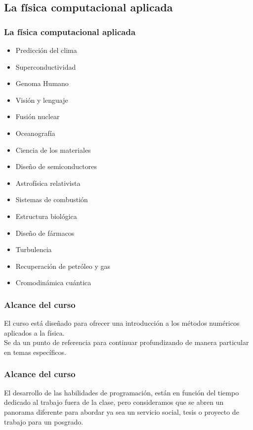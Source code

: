 \subsection{La física computacional aplicada}
\begin{frame}
\frametitle{La física computacional aplicada}
\fontsize{14}{14}\selectfont
\begin{multicols}{2}
\begin{itemize}[<+->]
	\item Predicción del clima
	\item Superconductividad
	\item Genoma Humano
	\item Visión y lenguaje
	\item Fusión nuclear
	\item Oceanografía
	\item Ciencia de los materiales
	\item Diseño de semiconductores
	\item Astrofísica relativista
	\item Sistemas de combustión
	\item Estructura biológica
	\item Diseño de fármacos
	\item Turbulencia
	\item Recuperación de petróleo y gas
	\item Cromodinámica cuántica
\end{itemize}
\end{multicols}
\end{frame}
\begin{frame}[fragile]
\begin{figure}
\centering

\end{figure}
\end{frame}
\begin{frame}
\frametitle{Alcance del curso}
El curso está diseñado para ofrecer una introducción a los métodos numéricos aplicados a la física.
\\
\medskip
Se da un punto de referencia para continuar profundizando de manera particular en temas específicos. 
\end{frame}
\begin{frame}
\frametitle{Alcance del curso}
El desarrollo de las habilidades de programación, están en función del tiempo dedicado al trabajo fuera de la clase, pero consideramos que se abren un panorama diferente para abordar ya sea un servicio social, tesis o proyecto de trabajo para un posgrado.
\end{frame}
